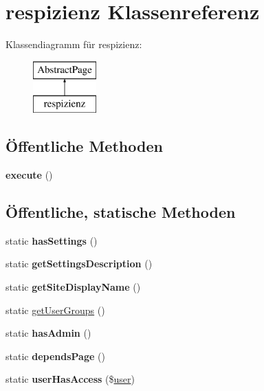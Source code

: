 \hypertarget{classrespizienz}{}\section{respizienz Klassenreferenz}
\label{classrespizienz}
Klassendiagramm für respizienz\+:\begin{figure}[H]
\begin{center}
\leavevmode
\includegraphics[height=2.000000cm]{classrespizienz}
\end{center}
\end{figure}
\subsection*{Öffentliche Methoden}
\begin{DoxyCompactItemize}
\item 
\mbox{\label{classrespizienz_ab112f8ee9e0380d4ae8d7d285e66619a}} 
{\bfseries execute} ()
\end{DoxyCompactItemize}
\subsection*{Öffentliche, statische Methoden}
\begin{DoxyCompactItemize}
\item 
\mbox{\label{classrespizienz_a6df1f399dccc9c19e7c0333d5664af98}} 
static {\bfseries has\+Settings} ()
\item 
\mbox{\label{classrespizienz_afb0b805fbb1589ce2e3c85b472bb3bea}} 
static {\bfseries get\+Settings\+Description} ()
\item 
\mbox{\label{classrespizienz_a86d81e2a8795398e6c49386fac344c1e}} 
static {\bfseries get\+Site\+Display\+Name} ()
\item 
static \mbox{\hyperlink{classrespizienz_a1555a3169044bf6ea827ac4731bcf90b}{get\+User\+Groups}} ()
\item 
\mbox{\label{classrespizienz_a3a24876e4266a0d0314c625fd312b8c6}} 
static {\bfseries has\+Admin} ()
\item 
\mbox{\label{classrespizienz_a2a60fff7b350a44e2be8e4353b4add0c}} 
static {\bfseries depends\+Page} ()
\item 
\mbox{\label{classrespizienz_aa33d75b72ec1a3dbea11322f91007341}} 
static {\bfseries user\+Has\+Access} (\$\mbox{\hyperlink{classuser}{user}})
\end{DoxyCompactItemize}
